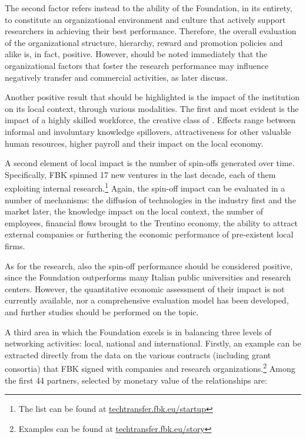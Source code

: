 The second factor refers instead to the ability of the Foundation, in its entirety, to constitute an organizational environment and culture that actively support researchers in achieving their best performance. Therefore, the overall evaluation of the organizational structure, hierarchy, reward and promotion policies and alike is, in fact, positive. However, should be noted immediately that the organizational factors that foster the research performance may influence negatively transfer and commercial activities, as later discuss.

Another positive result that should be highlighted is the impact of the institution on its local context, through various modalities. The first and most evident is the impact of a highly skilled workforce, the creative class of \citet{Florida2002}. Effects range between informal and involuntary knowledge spillovers, attractiveness for other valuable human resources, higher payroll and their impact on the local economy. 

A second element of local impact is the number of spin-offs generated over time. Specifically, FBK spinned 17 new ventures in the last decade, each of them exploiting internal research.\footnote{The list can be found at \href{https://techtransfer.fbk.eu/startup/}{techtransfer.fbk.eu/startup}}
Again, the spin-off impact can be evaluated in a number of mechanisms: the diffusion of technologies in the industry first and the market later, the knowledge impact on the local context, the number of employees, financial flows brought to the Trentino economy, the ability to attract external companies or furthering the economic performance of pre-existent local firms. 

As for the research, also the spin-off performance should be considered positive, since the Foundation outperforms many Italian public universities and research centers. However, the quantitative economic assessment of their impact is not currently available, nor a comprehensive evaluation model has been developed, and further studies should be performed on the topic.

A third area in which the Foundation excels is in balancing three levels of networking activities: local, national and international. Firstly, an example can be extracted directly from the data on the various contracts (including grant consortia) that FBK signed with companies and research organizations.\footnote{Examples can be found at \href{https://techtransfer.fbk.eu/story/}{techtransfer.fbk.eu/story}} Among the first 44 partners, selected by monetary value of the relationships are:

